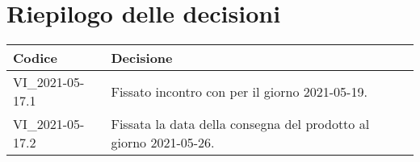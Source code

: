 \section{Riepilogo delle decisioni}
\setcounter{table}{-1}
{

\centering
\renewcommand{\arraystretch}{1.5}
\begin{longtable}{>{\centering}p{} >{}p{}}
\rowcolor{azzurro1}
\textbf{Codice} &
\centerline{\textbf{Decisione}}\\
\endhead

VI{\_}2021-05-17.1 & Fissato incontro con \proponProg{} per il giorno 2021-05-19.\\
VI{\_}2021-05-17.2 & Fissata la data della consegna del prodotto al giorno 2021-05-26.\\
\end{longtable}
}